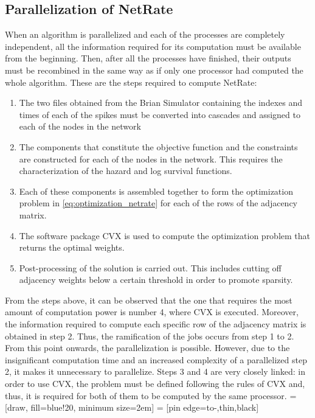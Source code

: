 \documentclass[11pt]{article}
\begin{document}
\subsection{Parallelization of NetRate}

When an algorithm is parallelized and each of the processes are completely independent, all the information required for its computation must be available from the beginning. Then, after all the processes have finished, their outputs must be recombined in the same way as if only one processor had computed the whole algorithm. These are the steps required to compute NetRate:

\begin{enumerate}
\item The two files obtained from the Brian Simulator containing the indexes and times of each of the spikes must be converted into cascades and assigned to each of the nodes in the network
\item The components that constitute the objective function and the constraints are constructed for each of the nodes in the network. This requires the characterization of the hazard and log survival functions.
\item Each of these components is assembled together to form the optimization problem in \ref{eq:optimization_netrate} for each of the rows of the adjacency matrix.
\item The software package CVX is used to compute the optimization problem that returns the optimal weights.
\item Post-processing of the solution is carried out. This includes cutting off adjacency weights below a certain threshold in order to promote sparsity.
\end{enumerate}

From the steps above, it can be observed that the one that requires the most amount of computation power is number 4, where CVX is executed. Moreover, the information required to compute each specific row of the adjacency matrix is obtained in step 2. Thus, the ramification of the jobs occurs from step 1 to 2. From this point onwards, the parallelization is possible. However, due to the insignificant computation time and an increased complexity of a parallelized step 2, it makes it unnecessary to parallelize. 
Steps 3 and 4 are very closely linked: in order to use CVX, the problem must be defined following the rules of CVX and, thus, it is required for both of them to be computed by the same processor.
=[draw, fill=blue!20, minimum size=2em]
 = [pin edge={to-,thin,black}]
\end{document}
